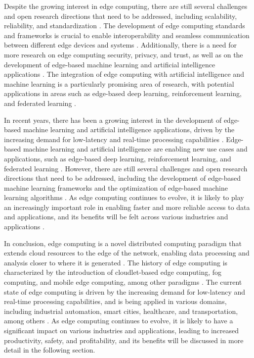 \documentclass[11pt]{article}
\begin{document}
Despite the growing interest in edge computing, there are still several challenges and open research directions that need to be addressed, including scalability, reliability, and standardization \cite{ref1}. The development of edge computing standards and frameworks is crucial to enable interoperability and seamless communication between different edge devices and systems \cite{ref2}. Additionally, there is a need for more research on edge computing security, privacy, and trust, as well as on the development of edge-based machine learning and artificial intelligence applications \cite{ref4}. The integration of edge computing with artificial intelligence and machine learning is a particularly promising area of research, with potential applications in areas such as edge-based deep learning, reinforcement learning, and federated learning \cite{ref5}.

In recent years, there has been a growing interest in the development of edge-based machine learning and artificial intelligence applications, driven by the increasing demand for low-latency and real-time processing capabilities \cite{ref6}. Edge-based machine learning and artificial intelligence are enabling new use cases and applications, such as edge-based deep learning, reinforcement learning, and federated learning \cite{ref5}. However, there are still several challenges and open research directions that need to be addressed, including the development of edge-based machine learning frameworks and the optimization of edge-based machine learning algorithms \cite{ref7}. As edge computing continues to evolve, it is likely to play an increasingly important role in enabling faster and more reliable access to data and applications, and its benefits will be felt across various industries and applications \cite{ref1}.

In conclusion, edge computing is a novel distributed computing paradigm that extends cloud resources to the edge of the network, enabling data processing and analysis closer to where it is generated \cite{ref1}. The history of edge computing is characterized by the introduction of cloudlet-based edge computing, fog computing, and mobile edge computing, among other paradigms \cite{ref2}. The current state of edge computing is driven by the increasing demand for low-latency and real-time processing capabilities, and is being applied in various domains, including industrial automation, smart cities, healthcare, and transportation, among others \cite{ref3}. As edge computing continues to evolve, it is likely to have a significant impact on various industries and applications, leading to increased productivity, safety, and profitability, and its benefits will be discussed in more detail in the following section.
\end{document}
